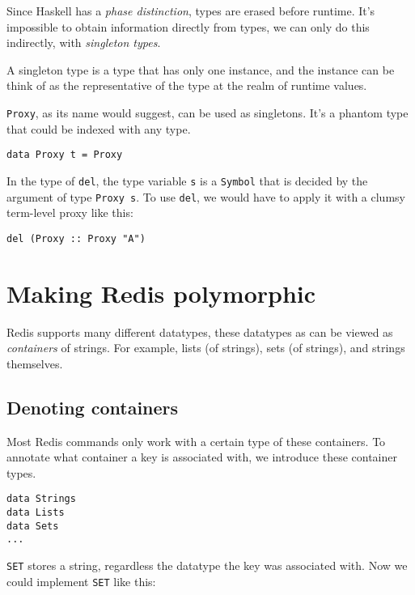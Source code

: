 \documentclass[pldi]{sigplanconf-pldi16}
\begin{document}
Since Haskell has a \emph{phase distinction}\cite{phasedistinction}, types are
 erased before runtime. It's impossible to obtain information directly from
 types, we can only do this indirectly, with
 \emph{singleton types}\cite{singletons}.

A singleton type is a type that has only one instance, and the instance can be
 think of as the representative of the type at the realm of runtime values.

\texttt{Proxy}, as its name would suggest, can be used as
 singletons. It's a phantom type that could be indexed with any type.

\begin{verbatim}
data Proxy t = Proxy
\end{verbatim}

In the type of \texttt{del}, the type variable
 \texttt{s} is a \texttt{Symbol} that is decided by
 the argument of type \texttt{Proxy s}.
 To use \texttt{del}, we would have to apply it with a clumsy
 term-level proxy like this:

\begin{verbatim}
del (Proxy :: Proxy "A")
\end{verbatim}

\section{Making Redis polymorphic}

Redis supports many different datatypes, these datatypes as can be viewed as
 \emph{containers} of strings. For example, lists (of strings),
 sets (of strings), and strings themselves.

\subsection{Denoting containers}
Most Redis commands only work with a certain type of these containers. To
 annotate what container a key is associated with, we introduce these container
 types.

\begin{verbatim}
data Strings
data Lists
data Sets
...
\end{verbatim}

\texttt{SET} stores a string, regardless the datatype the key was
 associated with. Now we could implement \texttt{SET} like this:
\end{document}
